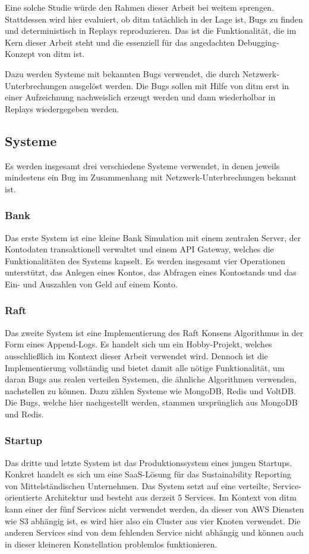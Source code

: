 \documentclass[12pt,a4paper]{report}
\begin{document}
Eine solche Studie würde den Rahmen dieser Arbeit bei weitem sprengen. Stattdessen wird hier evaluiert, ob ditm tatächlich in der
Lage ist, Bugs zu finden und deterministisch in Replays reproduzieren. Das ist die Funktionalität, die im Kern dieser Arbeit steht
und die essenziell für das angedachten Debugging-Konzept von ditm ist.

Dazu werden Systeme mit bekannten Bugs verwendet, die durch Netzwerk-Unterbrechungen ausgelöst werden. Die Bugs sollen mit Hilfe
von ditm erst in einer Aufzeichnung nachweislich erzeugt werden und dann wiederholbar in Replays wiedergegeben werden.

\subsection{Systeme}
Es werden insgesamt drei verschiedene Systeme verwendet, in denen jeweils mindestens ein Bug im Zusammenhang mit
Netzwerk-Unterbrechungen bekannt ist.

\subsubsection{Bank}
Das erste System ist eine kleine Bank Simulation mit einem zentralen Server, der Kontodaten transaktionell verwaltet und einem API
Gateway, welches die Funktionalitäten des Systems kapselt. Es werden insgesamt vier Operationen unterstützt, das Anlegen eines
Kontos, das Abfragen eines Kontostands und das Ein- und Auszahlen von Geld auf einem Konto.

\subsubsection{Raft}
\label{chap:raft}
Das zweite System ist eine Implementierung des Raft Konsens Algorithmus in der Form eines Append-Logs. Es handelt sich um ein
Hobby-Projekt, welches ausschließlich im Kontext dieser Arbeit verwendet wird. Dennoch ist die Implementierung vollständig und
bietet damit alle nötige Funktionalität, um daran Bugs aus realen verteilen Systemen, die ähnliche Algorithmen verwenden,
nachstellen zu können. Dazu zählen Systeme wie MongoDB, Redis und VoltDB. Die Bugs, welche hier nachgestellt werden, stammen
ursprünglich aus MongoDB und Redis.

\subsubsection{Startup}
Das dritte und letzte System ist das Produktionssystem eines jungen Startups. Konkret handelt es sich um eine SaaS-Lösung für das
Sustainability Reporting von Mittelständischen Unternehmen. Das System setzt auf eine verteilte, Service-orientierte Architektur
und besteht aus derzeit 5 Services. Im Kontext von ditm kann einer der fünf Services nicht verwendet werden, da dieser von AWS
Diensten wie S3 abhängig ist, es wird hier also ein Cluster aus vier Knoten verwendet. Die anderen Services sind von dem
fehlenden Service nicht abhängig und können auch in dieser kleineren Konstellation problemlos funktionieren.
\end{document}
